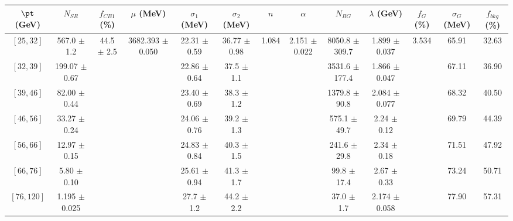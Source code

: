 \begin{tabular}{c||c|c|c|c|c|c|c|c|c|c|c||c}
$\pt$ (GeV) & $N_{SR}$ & $f_{CB1}$ (\%) & $\mu$ (MeV) & $\sigma_1$ (MeV) & $\sigma_2$ (MeV) & $n$ & $\alpha$ & $N_{BG}$ & $\lambda$ (GeV) & $f_G$ (\%) & $\sigma_G$ (MeV) & $f_{bkg}$ (\%) \\
\hline
$[25, 32]$ & 567.0 $\pm$ 1.2 & \multirow{7}{*}{44.5 $\pm$ 2.5} & \multirow{7}{*}{3682.393 $\pm$ 0.050} & 22.31 $\pm$ 0.59 & 36.77 $\pm$ 0.98 & \multirow{7}{*}{1.084} & \multirow{7}{*}{2.151 $\pm$ 0.022} & 8050.8 $\pm$ 309.7 & 1.899 $\pm$ 0.037 & \multirow{7}{*}{3.534} & 65.91 & 32.63\\
$[32, 39]$ & 199.07 $\pm$ 0.67 &  &  & 22.86 $\pm$ 0.64 & 37.5 $\pm$ 1.1 &  &  & 3531.6 $\pm$ 177.4 & 1.866 $\pm$ 0.047 &  & 67.11 & 36.90\\
$[39, 46]$ & 82.00 $\pm$ 0.44 &  &  & 23.40 $\pm$ 0.69 & 38.3 $\pm$ 1.2 &  &  & 1379.8 $\pm$ 90.8 & 2.084 $\pm$ 0.077 &  & 68.32 & 40.50\\
$[46, 56]$ & 33.27 $\pm$ 0.24 &  &  & 24.06 $\pm$ 0.76 & 39.2 $\pm$ 1.3 &  &  & 575.1 $\pm$ 49.7 & 2.24 $\pm$ 0.12 &  & 69.79 & 44.39\\
$[56, 66]$ & 12.97 $\pm$ 0.15 &  &  & 24.83 $\pm$ 0.84 & 40.3 $\pm$ 1.5 &  &  & 241.6 $\pm$ 29.8 & 2.34 $\pm$ 0.18 &  & 71.51 & 47.92\\
$[66, 76]$ & 5.80 $\pm$ 0.10 &  &  & 25.61 $\pm$ 0.94 & 41.3 $\pm$ 1.7 &  &  & 99.8 $\pm$ 17.4 & 2.67 $\pm$ 0.33 &  & 73.24 & 50.71\\
$[76, 120]$ & 1.195 $\pm$ 0.025 &  &  & 27.7 $\pm$ 1.2 & 44.2 $\pm$ 2.2 &  &  & 37.0 $\pm$ 1.7 & 2.174 $\pm$ 0.058 &  & 77.90 & 57.31\\
\end{tabular}
